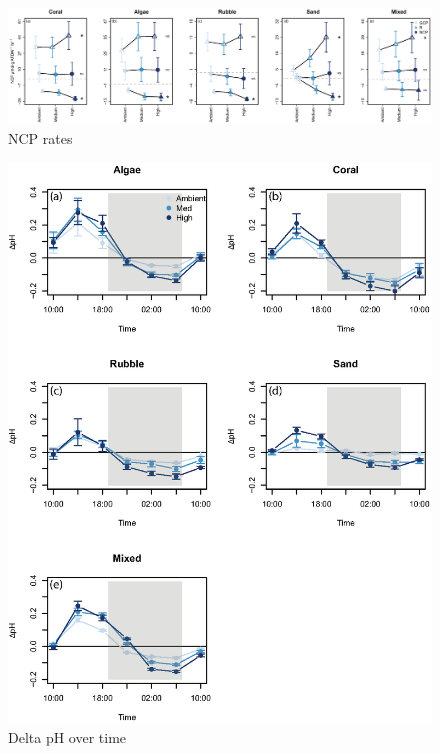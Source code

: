 \documentclass{article}%
\begin{document}
\begin{figure}[!h]
\centering\includegraphics[width=6.5in]{MeanRates_NCP.eps}
\caption{NCP rates}
\label{NCP}
\end{figure}

\begin{figure}[!h]
\centering\includegraphics[width=6.5in]{DeltapHTime.eps}
\caption{Delta pH over time}
\label{DeltapH}
\end{figure}
\end{document}
